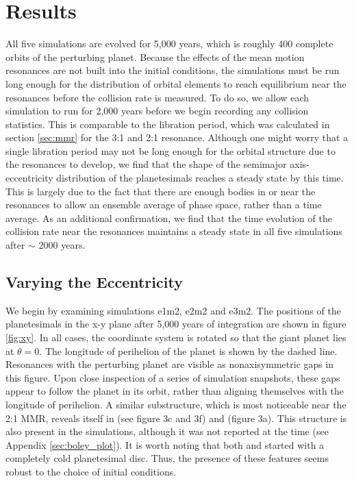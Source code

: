\documentclass[fleqn,usenatbib]{mnras}
\begin{document}
\section{Results} \label{sec:results}

All five simulations are evolved for 5,000 years, which is roughly 400 complete orbits of the perturbing planet. Because the effects of the mean 
motion resonances are not built into the initial conditions, the simulations must be run long enough for the distribution of orbital elements to reach 
equilibrium near the resonances before the collision rate is measured. To do so, we allow each simulation to run for 2,000 years before we begin recording any collision statistics. 
This is comparable to the libration period, which was calculated in section \ref{sec:mmr} for the 3:1 and 2:1 resonance. Although one might worry that a single libration period may not be 
long enough for the orbital structure due to the resonances to develop, we find that the shape of the semimajor axis-eccentricity distribution of the planetesimals reaches a steady state by 
this time. This is largely due to the fact that there are enough bodies in or near the resonances to allow an ensemble average of phase space, rather than a time average. As an additional 
confirmation, we find that the time evolution of the collision rate near the resonances maintains a steady state in all five simulations after $\sim$ 2000 years.

\subsection{Varying the Eccentricity} \label{sec:vary_ecc}

We begin by examining simulations e1m2, e2m2 and e3m2. The positions of the planetesimals in the x-y plane after 5,000 years of integration are 
shown in figure \ref{fig:xy}. In all cases, the coordinate system is rotated so that the giant planet lies at $\theta = 0$. The longitude of perihelion of 
the planet is shown by the dashed line. Resonances with the perturbing planet are visible as nonaxisymmetric gaps in this figure. Upon close inspection of a 
series of simulation snapshots, these gaps appear to follow the planet in its orbit, rather than aligning themselves with the longitude of perihelion. A 
similar substructure, which is most noticeable near the 2:1 MMR, reveals itself in \citet{2000Icar..143...45R} (see figure 3c and 3f) and 
\citet{2016ApJ...818..159T} (figure 3a). This structure is also present in the \citet{2017ApJ...850..103B} simulations, although it was not reported at the 
time (see Appendix \ref{sec:boley_plot}). It is worth noting that both \citet{2000Icar..143...45R} and \citet{2017ApJ...850..103B} started with a completely cold planetesimal disc. 
Thus, the presence of these features seems robust to the choice of initial conditions.
\end{document}

